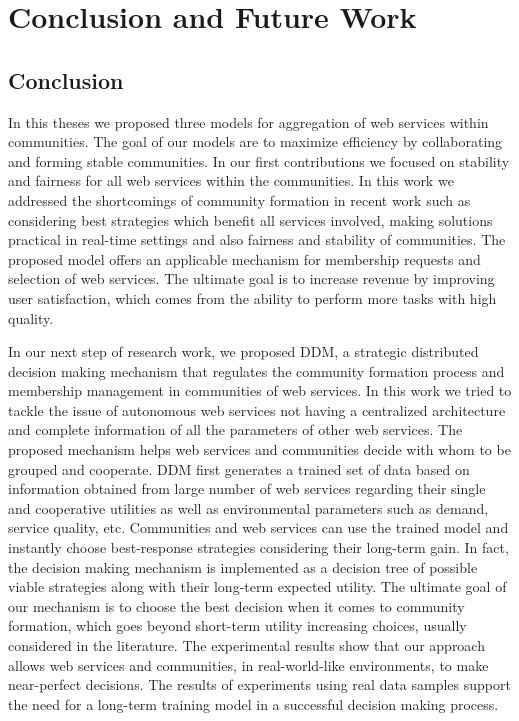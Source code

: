 \chapter{Conclusion and Future Work}\label{Chap5:Conclusion}

\section{Conclusion}

In this theses we proposed three models for aggregation of web services within communities. The goal of our models are to maximize efficiency by collaborating and forming stable communities. In our first contributions we focused on stability and fairness for all web services within the communities. In this work we addressed the shortcomings of community formation in recent work such as considering best strategies which benefit all services involved, making solutions practical in real-time settings and also fairness and stability of communities. The proposed model offers an applicable mechanism for membership requests and selection of web services. The ultimate goal is to increase revenue by improving user satisfaction, which comes from the ability to perform more tasks with high quality.

In our next step of research work, we proposed DDM, a strategic distributed decision making mechanism that regulates the community formation process and membership management in communities of web services. In this work we tried to tackle the issue of autonomous web services not having a centralized architecture and complete information of all the parameters of other web services. The proposed mechanism helps web services and communities decide with whom to be grouped and cooperate. DDM first generates a trained set of data based on information obtained from large number of web services regarding their single and cooperative utilities as well as environmental parameters such as demand, service quality, etc. Communities and web services can use the trained model and instantly choose best-response strategies considering their long-term gain. In fact, the decision making mechanism is implemented as a decision tree of possible viable strategies along with their long-term expected utility. The ultimate goal of our mechanism is to choose the best decision when it comes to community formation, which goes beyond short-term utility increasing choices, usually considered in the literature. The experimental results show that our approach allows web services and communities, in real-world-like environments, to make near-perfect decisions. The results of experiments using real data samples support the need for a long-term training model in a successful decision making process.

